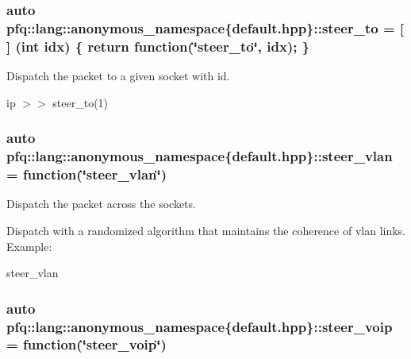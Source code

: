 \subsubsection[{\texorpdfstring{steer\+\_\+to}{steer_to}}]{\setlength{\rightskip}{0pt plus 5cm}auto pfq\+::lang\+::anonymous\+\_\+namespace\{default.\+hpp\}\+::steer\+\_\+to = \mbox{[}$\,$\mbox{]} (int idx) \{ return {\bf function}(\char`\"{}steer\+\_\+to\char`\"{}, idx); \}}\hypertarget{namespacepfq_1_1lang_1_1anonymous__namespace_02default_8hpp_03_a4980fea0af16a26df90f252b5ae21113}{}\label{namespacepfq_1_1lang_1_1anonymous__namespace_02default_8hpp_03_a4980fea0af16a26df90f252b5ae21113}


Dispatch the packet to a given socket with id. 

ip $>$$>$ steer\+\_\+to(1) 
\subsubsection[{\texorpdfstring{steer\+\_\+vlan}{steer_vlan}}]{\setlength{\rightskip}{0pt plus 5cm}auto pfq\+::lang\+::anonymous\+\_\+namespace\{default.\+hpp\}\+::steer\+\_\+vlan = {\bf function}(\char`\"{}steer\+\_\+vlan\char`\"{})}\hypertarget{namespacepfq_1_1lang_1_1anonymous__namespace_02default_8hpp_03_a2c6a8ad5a3ae8b60a6a3d18a510f22ac}{}\label{namespacepfq_1_1lang_1_1anonymous__namespace_02default_8hpp_03_a2c6a8ad5a3ae8b60a6a3d18a510f22ac}


Dispatch the packet across the sockets. 

Dispatch with a randomized algorithm that maintains the coherence of vlan links. Example\+:

steer\+\_\+vlan 
\subsubsection[{\texorpdfstring{steer\+\_\+voip}{steer_voip}}]{\setlength{\rightskip}{0pt plus 5cm}auto pfq\+::lang\+::anonymous\+\_\+namespace\{default.\+hpp\}\+::steer\+\_\+voip = {\bf function}(\char`\"{}steer\+\_\+voip\char`\"{})}\hypertarget{namespacepfq_1_1lang_1_1anonymous__namespace_02default_8hpp_03_a50fa612c45aa8f8dfd3259e2d0cbfce0}{}\label{namespacepfq_1_1lang_1_1anonymous__namespace_02default_8hpp_03_a50fa612c45aa8f8dfd3259e2d0cbfce0}


